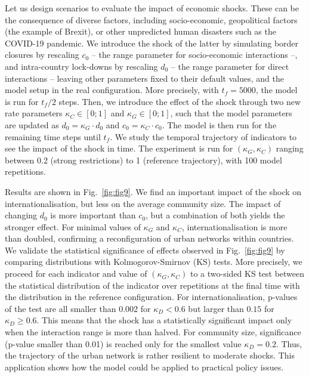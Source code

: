 \documentclass[10pt,letterpaper]{article}
\begin{document}
Let us design scenarios to evaluate the impact of economic shocks. These can be the consequence of diverse factors, including socio-economic, geopolitical factors (the example of Brexit), or other unpredicted human disasters such as the COVID-19 pandemic. We introduce the shock of the latter by simulating border closures by rescaling $c_0$ -- the range parameter for socio-economic interactions --, and intra-country lock-downs by rescaling $d_0$ -- the range parameter for direct interactions -- leaving other parameters fixed to their default values, and the model setup in the real configuration. More precisely, with $t_f = 5000$, the model is run for $t_f / 2$ steps. Then, we introduce the effect of the shock through two new rate parameters $\kappa_C \in \left[0;1\right]$ and $\kappa_G \in \left[0;1\right]$, such that the model parameters are updated as $d_0 = \kappa_G \cdot d_0$ and $c_0 = \kappa_C \cdot c_0$. The model is then run for the remaining time steps until $t_f$. We study the temporal trajectory of indicators to see the impact of the shock in time. The experiment is run for $(\kappa_G,\kappa_C)$ ranging between 0.2 (strong restrictions) to 1 (reference trajectory), with 100 model repetitions.

Results are shown in Fig.~\ref{fig:fig9}. We find an important impact of the shock on internationalisation, but less on the average community size. The impact of changing $d_0$ is more important than $c_0$, but a combination of both yields the stronger effect. For minimal values of $\kappa_G$ and $\kappa_C$, internationalisation is more than doubled, confirming a reconfiguration of urban networks within countries. We validate the statistical significance of effects observed in Fig.~\ref{fig:fig9} by comparing distributions with Kolmogorov-Smirnov (KS) tests. More precisely, we proceed for each indicator and value of $(\kappa_G,\kappa_C)$ to a two-sided KS test between the statistical distribution of the indicator over repetitions at the final time with the distribution in the reference configuration. For internationalisation, p-values of the test are all smaller than 0.002 for $\kappa_D < 0.6$ but larger than $0.15$ for $\kappa_D \geq 0.6$. This means that the shock has a statistically significant impact only when the interaction range is more than halved. For community size, significance (p-value smaller than 0.01) is reached only for the smallest value $\kappa_D = 0.2$. Thus, the trajectory of the urban network is rather resilient to moderate shocks. This application shows how the model could be applied to practical policy issues.
\end{document}
